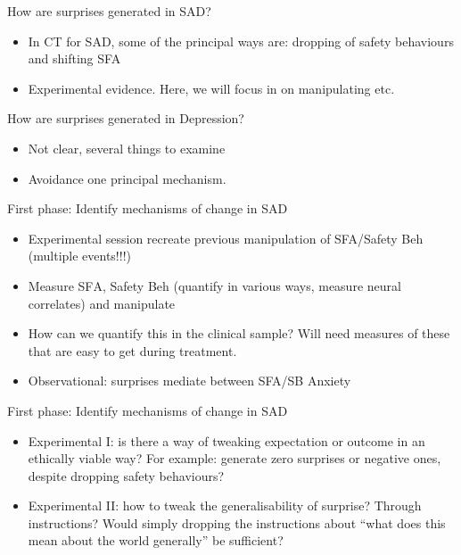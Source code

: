 \documentclass[
  ignorenonframetext,
]{beamer}
\begin{document}
\begin{frame}{How are surprises generated in SAD?}
\protect\hypertarget{how-are-surprises-generated-in-sad}{}

\begin{itemize}
\item
  In CT for SAD, some of the principal ways are: dropping of safety
  behaviours and shifting SFA
\item
  Experimental evidence. Here, we will focus in on manipulating etc.
\end{itemize}

\end{frame}

\begin{frame}{How are surprises generated in Depression?}
\protect\hypertarget{how-are-surprises-generated-in-depression}{}

\begin{itemize}
\item
  Not clear, several things to examine
\item
  Avoidance one principal mechanism.
\end{itemize}

\end{frame}

\begin{frame}{First phase: Identify mechanisms of change in SAD}
\protect\hypertarget{first-phase-identify-mechanisms-of-change-in-sad}{}

\begin{itemize}
\item
  Experimental session recreate previous manipulation of SFA/Safety Beh
  (multiple events!!!)
\item
  Measure SFΑ, Safety Beh (quantify in various ways, measure neural
  correlates) and manipulate
\item
  How can we quantify this in the clinical sample? Will need measures of
  these that are easy to get during treatment.
\item
  Observational: surprises mediate between SFA/SB Anxiety
\end{itemize}

\end{frame}

\begin{frame}{First phase: Identify mechanisms of change in SAD}
\protect\hypertarget{first-phase-identify-mechanisms-of-change-in-sad-1}{}

\begin{itemize}
\item
  Experimental I: is there a way of tweaking expectation or outcome in
  an ethically viable way? For example: generate zero surprises or
  negative ones, despite dropping safety behaviours?
\item
  Experimental II: how to tweak the generalisability of surprise?
  Through instructions? Would simply dropping the instructions about
  ``what does this mean about the world generally'' be sufficient?
\end{itemize}

\end{frame}
\end{document}
